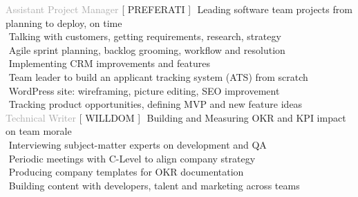
    
\begin{cvtable}

% 

{\textcolor{darkgray}{Assistant Project Manager}}%
{[ {P\scriptsize REFERATI} ]}%
{%
     \textperiodcentered $ $ Leading software team projects from planning to deploy, on time \\
     \textperiodcentered $ $ Talking with customers, getting requirements, research, strategy \\
     \textperiodcentered $ $ Agile sprint planning, backlog grooming, workflow and resolution \\
     \textperiodcentered $ $ Implementing CRM improvements and features \\
     \textperiodcentered $ $ Team leader to build an applicant tracking system (ATS) from scratch \\
     \textperiodcentered $ $ WordPress site: wireframing, picture editing, SEO improvement \\
     \textperiodcentered $ $ Tracking product opportunities, defining MVP and new feature ideas \\
} 
% 
% 
{\textcolor{darkgray}{%
    Technical Writer
    }}%
{[ {W\scriptsize ILL}{D\scriptsize OM} ]}%
{%
    \textperiodcentered $ $ Building and Measuring OKR and KPI impact on team morale \\
    \textperiodcentered $ $ Interviewing subject-matter experts on development and QA \\
    \textperiodcentered $ $ Periodic meetings with C-Level to align company strategy  \\
    \textperiodcentered $ $ Producing company templates for OKR documentation \\
    \textperiodcentered $ $ Building content with developers, talent and marketing across teams 
} 


\end{cvtable}
